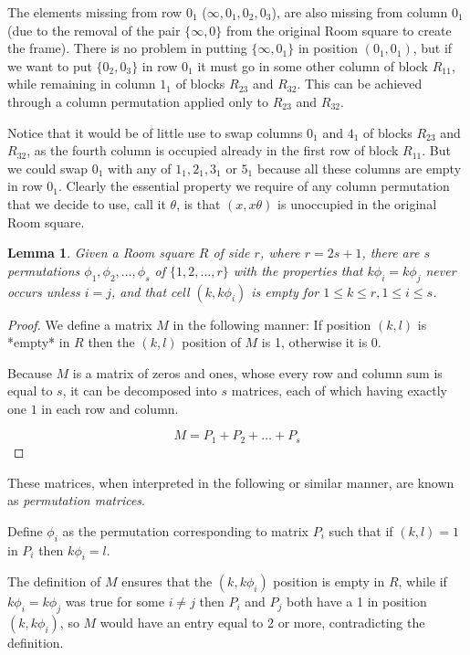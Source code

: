 \documentclass[
  11pt,
  a4paper]{book}
\newtheorem{lemma}[theorem]{Lemma}
\begin{document}
The elements missing from row \(0_1\) (\(\infty, 0_1, 0_2, 0_3\)), are
also missing from column \(0_1\) (due to the removal of the pair
\(\{\infty,0\}\) from the original Room square to create the frame).
There is no problem in putting \(\{\infty,0_1\}\) in position
\((0_1,0_1)\), but if we want to put \(\{0_2,0_3\}\) in row \(0_1\) it
must go in some other column of block \(R_{11}\), while remaining in
column \(1_1\) of blocks \(R_{23}\) and \(R_{32}\). This can be achieved
through a column permutation applied only to \(R_{23}\) and \(R_{32}\).

Notice that it would be of little use to swap columns \(0_1\) and
\(4_1\) of blocks \(R_{23}\) and \(R_{32}\), as the fourth column is
occupied already in the first row of block \(R_{11}\). But we could swap
\(0_1\) with any of \(1_1,2_1,3_1\) or \(5_1\) because all these columns
are empty in row \(0_1\). Clearly the essential property we require of
any column permutation that we decide to use, call it \(\theta\), is
that \((x,x\theta)\) is unoccupied in the original Room square.

\begin{lemma}
\label{lem:permute}
Given a Room square $R$ of side $r$, where $r=2s+1$, there
are $s$ permutations $\phi_1,\phi_2,...,\phi_s$ of
$\{1,2,...,r\}$ with the properties that $k\phi_i=k\phi_j$
never occurs unless $i=j$, and that cell $(k,k\phi_i)$ is
empty for $1 \leq k \leq r, 1 \leq i\leq s$.
\end{lemma}

\begin{proof}
We define a matrix $M$ in the following manner: If position
$(k,l)$ is *empty* in $R$ then the $(k,l)$ position of $M$
is 1, otherwise it is 0.

Because $M$ is a matrix of zeros and ones, whose every row and
column sum is equal to $s$, it can be decomposed into $s$
matrices, each of which having exactly one $1$ in each row
and column.

\begin{equation}
M = P_1 + P_2 + \ldots + P_s
\end{equation}
\end{proof}

These matrices, when interpreted in the following or similar manner, are
known as \emph{permutation matrices}.

Define \(\phi_i\) as the permutation corresponding to matrix \(P_i\)
such that if \((k,l) = 1\) in \(P_i\) then \(k\phi _i = l\).

The definition of \(M\) ensures that the \((k, k\phi _i)\) position is
empty in \(R\), while if \(k\phi_{i} = k\phi_{j}\) was true for some
\(i \neq j\) then \(P_i\) and \(P_j\) both have a 1 in position
\((k, k\phi_i)\), so \(M\) would have an entry equal to 2 or more,
contradicting the definition.
\end{document}
